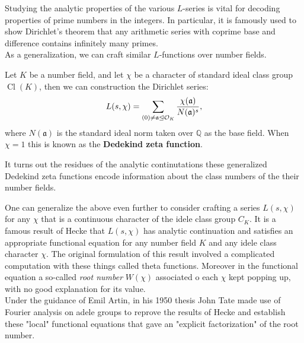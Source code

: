 \documentclass[11pt, x11names]{book}
\newcommand{\qq}{\mathbb{Q}}
\newcommand{\fraka}{\mathfrak{a}}
\newcommand{\ideal}{\trianglelefteq}
\DeclareMathOperator{\cl}{Cl}
\begin{document}
Studying the analytic properties of the various $L$-series is vital for decoding properties of prime numbers in the integers. In particular, it is famously used to show Dirichlet's theorem that any arithmetic series with coprime base and difference contains infinitely many primes.\\

As a generalization, we can craft similar $L$-functions over number fields.

\begin{example}
\label{example: Generalized Dedekind Zeta}
Let $K$ be a number field, and let $\chi$ be a character of standard ideal class group $\cl(K)$, then we can construction the Dirichlet series:
\begin{equation*}
    L(s, \chi) = \sum_{(0) \neq \fraka \ideal \calo_K} \frac{\chi(\fraka)}{N(\fraka)^s},
\end{equation*}
where $N(\fraka)$ is the standard ideal norm taken over $\qq$ as the base field. When $\chi = 1$ this is known as the \textbf{Dedekind zeta function}.
\end{example}

It turns out the residues of the analytic continutations these generalized Dedekind zeta functions encode information about the class numbers of the their number fields. 

One can generalize the above even further to consider crafting a series $L(s, \chi)$ for any $\chi$ that is a continuous character of the idele class group $C_K$. It is a famous result of Hecke that $L(s, \chi)$ has analytic continuation and satisfies an appropriate functional equation for any number field $K$ and any idele class character $\chi$. The original formulation of this result involved a complicated computation with these things called theta functions. Moreover in the functional equation a so-called \textit{root number} $W(\chi)$ associated o each $\chi$ kept popping up, with no good explanation for its value.\\
Under the guidance of Emil Artin, in his 1950 thesis John Tate made use of Fourier analysis on adele groups to reprove the results of Hecke and establish these "local" functional equations that gave an "explicit factorization" of the root number.\\
\end{document}
